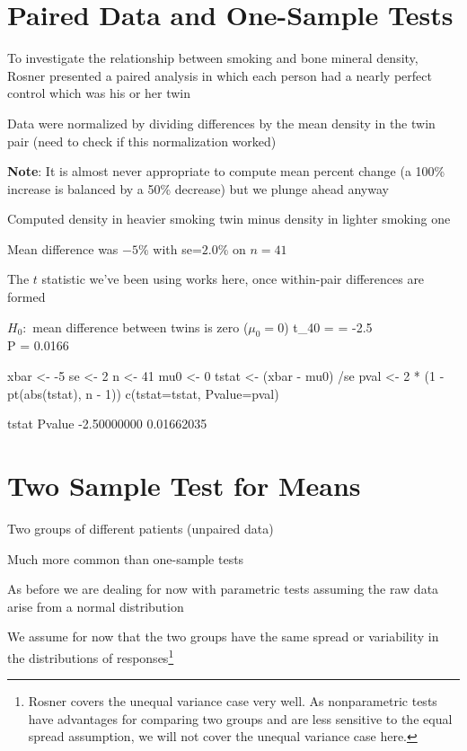 \section{Paired Data and One-Sample Tests}  
\bi
\item To investigate the relationship between smoking and bone mineral
  density, Rosner presented a paired analysis in which each person had
  a nearly perfect control which was his or her twin
\item Data were normalized by dividing differences by the mean density
  in the twin pair (need to check if this normalization worked)
\item \textbf{Note}: It is almost never appropriate to compute mean percent change (a 100\% increase is balanced by a 50\% decrease) but we plunge ahead anyway
\item Computed density in heavier smoking twin minus density in
  lighter smoking one
\item Mean difference was $-5\%$ with se=$2.0\%$ on $n=41$
\item The $t$ statistic we've been using works here, once within-pair
  differences are formed
\item $H_{0}:$ mean difference between twins is zero ($\mu_{0} = 0$)
\beqa
t_{40} =  = -2.5 \\
P = 0.0166
\eeqa
\ei
\begin{Schunk}
\begin{Sinput}
xbar  <- -5
se    <- 2
n     <- 41
mu0   <- 0
tstat <- (xbar - mu0) /se
pval  <- 2 * (1 - pt(abs(tstat), n - 1))
c(tstat=tstat, Pvalue=pval)
\end{Sinput}
\begin{Soutput}
      tstat      Pvalue 
-2.50000000  0.01662035 
\end{Soutput}
\end{Schunk}

\section{Two Sample Test for Means} 
\bi
\item Two groups of different patients (unpaired data)
\item Much more common than one-sample tests
\item As before we are dealing for now with parametric tests assuming
  the raw data arise from a normal distribution
\item We assume for now that the two groups have the same
  spread or variability in the distributions of
  responses\footnote{Rosner covers the unequal variance case very
    well.  As nonparametric tests have advantages for comparing two
    groups and are less sensitive to the equal spread assumption, we
    will not cover the unequal variance case here.}
\ei

